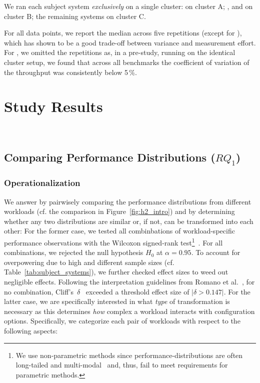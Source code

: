 We ran each subject system \textit{exclusively} on a single cluster: \htwo on cluster \textsf{A}; \dconvert, \batik and \jadx on cluster \textsf{B}; the remaining systems on cluster \textsf{C}.

For all data points, we report the median across five repetitions (except for \htwo), which has shown to be a good trade-off between variance and measurement effort. For \htwo, we omitted the repetitions as, in a pre-study, running on the identical cluster setup, we found that across all benchmarks the coefficient of variation of the throughput was consistently below 5\,\%.



\section{Study Results}~\label{sec:results}
\subsection{Comparing Performance Distributions ($RQ_1$)}\label{sec:rq1}
\subsubsection{Operationalization}
We answer  by pairwisely comparing the performance distributions from different workloads (cf. the comparison in Figure~\ref{fig:h2_intro}) and by determining whether any two distributions are similar or, if not, can be transformed into each other: For the former case, we tested all combinbations of workload-specific performance observations with the Wilcoxon signed-rank test\footnote{We use non-parametric methods since performance-distributions are often long-tailed and multi-modal~\cite{curtsinger_stabilizer_2013,maricq2018taming} and, thus, fail to meet requirements for parametric methods.}~\cite{lovric_international_2010}. For all combinations, we rejected the null hypothesis $H_0$ at $\alpha=0.95$. To account for overpowering due to high and different sample sizes (cf. Table~\ref{tab:subject_systems}), we further checked effect sizes to weed out negligible effects. Following the interpretation guidelines from Romano et al.~\cite{romano2006exploring}, for no combination, Cliff's~$\delta$~\cite{Cliff1993DominanceSO} exceeded a threshold effect size of $\vert\delta > 0.147\vert$.
For the latter case, we are specifically interested in what \textit{type} of transformation is necessary as this determines \textit{how} complex a workload interacts with configuration options. Specifically, we categorize each pair of workloads with respect to the following aspects: 

